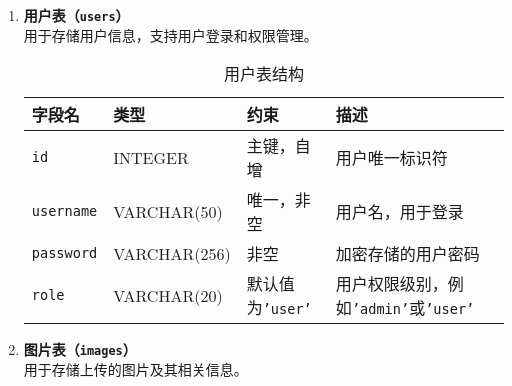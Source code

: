 \begin{enumerate}
    \item \textbf{用户表（\texttt{users}）} \\
    用于存储用户信息，支持用户登录和权限管理。
    \begin{table}[h!]
        \centering
        \begin{tabular}{|l|l|l|p{8cm}|}
            \hline
            \textbf{字段名} & \textbf{类型} & \textbf{约束} & \textbf{描述} \\
            \hline
            \texttt{id} & INTEGER & 主键，自增 & 用户唯一标识符 \\
            \texttt{username} & VARCHAR(50) & 唯一，非空 & 用户名，用于登录 \\
            \texttt{password} & VARCHAR(256) & 非空 & 加密存储的用户密码 \\
            \texttt{role} & VARCHAR(20) & 默认值为\texttt{'user'} & 用户权限级别，例如\texttt{'admin'}或\texttt{'user'} \\
            \hline
        \end{tabular}
        \caption{用户表结构}
        \label{tab:users}
    \end{table}

    \item \textbf{图片表（\texttt{images}）} \\
    用于存储上传的图片及其相关信息。
    \begin{table}[h!]
        \centering
        \caption{图片表结构}
        \label{tab:images}
    \end{table}


\end{enumerate}
